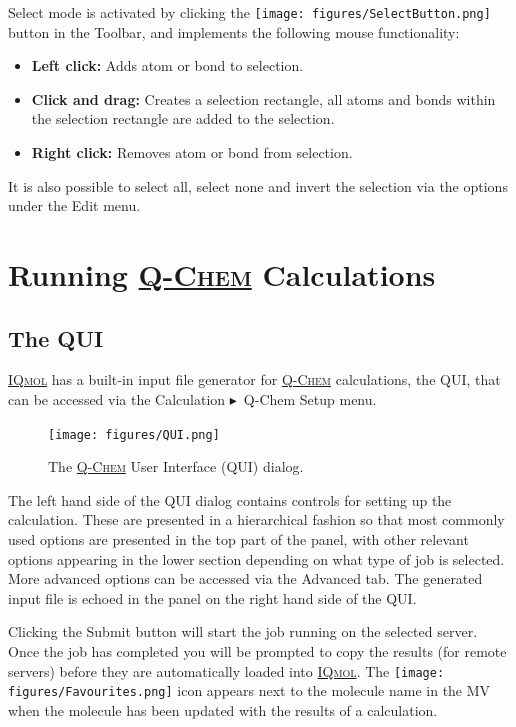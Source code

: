\documentclass[a4paper,12pt]{article}
\newcommand{\qchem}{\href{http://q-chem.com}{{\scshape Q-Chem}}}
\newcommand{\iqmol}{\href{http://iqmol.org}{{\scshape IQmol}}}
\newcommand{\bt}{\ensuremath{\blacktriangleright}}
\begin{document}
Select mode is activated by clicking the
\texttt{[image: figures/SelectButton.png]} button in the Toolbar,
and implements the following mouse functionality:
\begin{itemize}
\item {\bf Left click:} Adds atom or bond to selection. 
\item {\bf Click and drag:} Creates a selection rectangle, all atoms and bonds
           within the selection rectangle are added to the selection. 
\item {\bf Right click:}  Removes atom or bond from selection.
\end{itemize}
It is also possible to select all, select none and invert the selection via
the options under the Edit menu.




\newpage
\section{Running \qchem{} Calculations}

\subsection{The QUI}

\iqmol{} has a built-in input file generator for \qchem{} calculations, the
QUI, that can be accessed via the Calculation \bt\  Q-Chem Setup menu.  
\begin{figure}[h]
\begin{center}
\texttt{[image: figures/QUI.png]}
\caption{The \qchem{} User Interface (QUI) dialog.}
\end{center}
\end{figure}

The left hand side of the QUI dialog contains controls for setting up the
calculation.  These are presented in a hierarchical fashion so that most
commonly used options are presented in the top part of the panel, with other
relevant options appearing in the lower section depending on what type of job
is selected.  More advanced options can be accessed via the Advanced tab.  The
generated input file is echoed in the panel on the right hand side of the QUI.

Clicking the Submit button will start the job running on the selected server.
Once the job has completed you will be prompted to copy the results (for remote
servers) before they are automatically loaded into \iqmol{}.  The
\texttt{[image: figures/Favourites.png]} icon appears next to the
molecule name in the MV when the molecule has been updated with the
results of a calculation.
\end{document}
